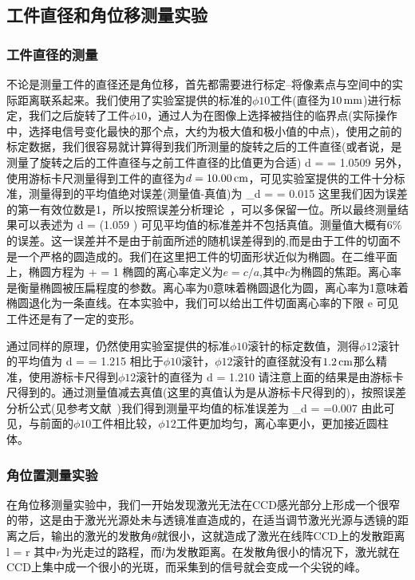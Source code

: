 \documentclass{ctexart}
\begin{document}
\subsection{工件直径和角位移测量实验}
\subsubsection{工件直径的测量}
不论是测量工件的直径还是角位移，首先都需要进行标定--将像素点与空间中的实际距离联系起来。我们使用了实验室提供的标准的$\phi 10$工件(直径为$10\,\mathrm{mm}$)进行标定，我们之后旋转了工件$\phi 10$，通过人为在图像上选择被挡住的临界点(实际操作中，选择电信号变化最快的那个点，大约为极大值和极小值的中点)，使用之前的标定数据，我们很容易就计算得到我们所测量的旋转之后的工件直径(或者说，是测量了旋转之后的工件直径与之前工件直径的比值更为合适)
\beq
d =  = 1.0509 \SIcm
\eeq
另外，使用游标卡尺测量得到工件的直径为$d = 10.00\,\mathrm{cm}$，可见实验室提供的工件十分标准，测量得到的平均值绝对误差(测量值-真值)为
\beq
\sigma_{d} =  = 0.015 \SIcm
\eeq
这里我们因为误差的第一有效位数是1，所以按照误差分析理论~\cite{error}，可以多保留一位。所以最终测量结果可以表述为
\beq
d = \left(1.059 \right) \SIcm
\eeq
可见平均值的标准差并不包括真值。测量值大概有$6\%$的误差。这一误差并不是由于前面所述的随机误差得到的,而是由于工件的切面不是一个严格的圆造成的。我们在这里把工件的切面形状近似为椭圆。在二维平面上，椭圆方程为
\beq
{} +  = 1
\eeq
椭圆的离心率定义为$e = c/a$,其中$c$为椭圆的焦距。离心率是衡量椭圆被压扁程度的参数。离心率为0意味着椭圆退化为圆，离心率为1意味着椭圆退化为一条直线。在本实验中，我们可以给出工件切面离心率的下限
\beq
e\ge {} 
\eeq
可见工件还是有了一定的变形。

通过同样的原理，仍然使用实验室提供的标准$\phi 10$滚针的标定数值，测得$\phi 12$滚针的平均值为
\beq
d =  = 1.215 \SIcm
\eeq
相比于$\phi 10$滚针，$\phi 12$滚针的直径就没有$1.2\,\mathrm{cm}$那么精准，使用游标卡尺得到$\phi 12$滚针的直径为
\beq
d = 1.210 \SIcm
\eeq
请注意上面的结果是由游标卡尺得到的。通过测量值减去真值(这里的真值认为是从游标卡尺得到的)，按照误差分析公式(见参考文献~\cite{error})我们得到测量平均值的标准误差为
\beq
\sigma_{d} =  =0.007 \SIcm
\eeq
由此可见，与前面的$\phi 10$工件相比较，$\phi 12$工件更加均匀，离心率更小，更加接近圆柱体。
\subsubsection{角位置测量实验}
在角位移测量实验中，我们一开始发现激光无法在CCD感光部分上形成一个很窄的带，这是由于激光光源处未与透镜准直造成的，在适当调节激光光源与透镜的距离之后，输出的激光的发散角$\theta$就很小，这就造成了激光在线阵CCD上的发散距离
\beq
l = r\theta
\eeq
其中$r$为光走过的路程，而$l$为发散距离。在发散角很小的情况下，激光就在CCD上集中成一个很小的光斑，而采集到的信号就会变成一个尖锐的峰。
\end{document}
